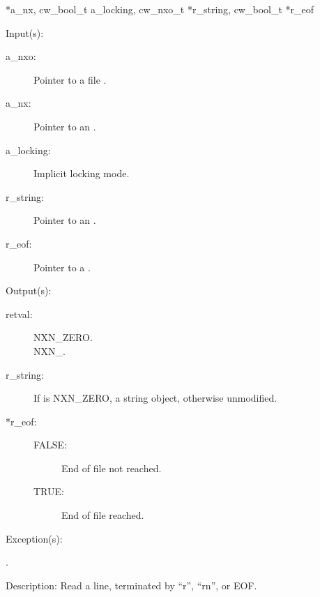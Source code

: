 \begin{capi}
{{*a\_nx, cw\_bool\_t a\_locking, cw\_nxo\_t *r\_string, cw\_bool\_t *r\_eof}}
	\begin{capilist}
	\item[Input(s): ]
		\begin{description}\item[]
		\item[a\_nxo: ]
			Pointer to a file .
		\item[a\_nx: ]
			Pointer to an .
		\item[a\_locking: ]
			Implicit locking mode.
		\item[r\_string: ]
			Pointer to an .
		\item[r\_eof: ]
			Pointer to a .
		\end{description}
	\item[Output(s): ]
		\begin{description}\item[]
		\item[retval: ]
			\begin{description}\item[]
			\item[NXN\_ZERO.]
			\item[NXN\_.]
			\end{description}
		\item[r\_string: ]
			If  is NXN\_ZERO, a string object,
			otherwise unmodified.
		\item[*r\_eof: ]
			\begin{description}\item[]
			\item[FALSE: ]
				End of file not reached.
			\item[TRUE: ]
				End of file reached.
			\end{description}
		\end{description}
	\item[Exception(s): ]
		\begin{description}\item[]
		\item[.]
		\end{description}
	\item[Description: ]
		Read a line, terminated by ``{\bs}r'', ``{\bs}r{\bs}n'', or EOF.
	\end{capilist}
\label{nxo_file_write}
\end{capi}
